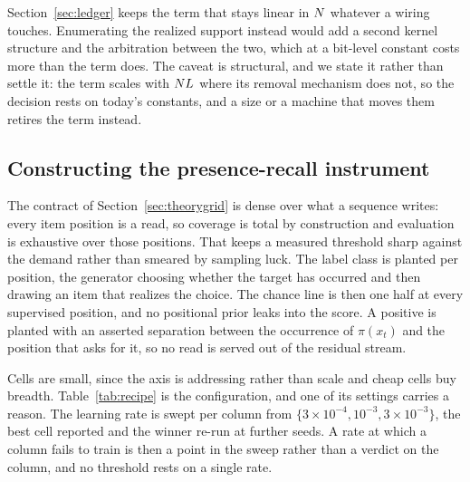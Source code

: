 Section~\ref{sec:ledger} keeps the term that stays linear in $N$ whatever a wiring touches. Enumerating the realized support instead would add a second kernel structure and the arbitration between the two, which at a bit-level constant costs more than the term does. The caveat is structural, and we state it rather than settle it: the term scales with $N L$ where its removal mechanism does not, so the decision rests on today's constants, and a size or a machine that moves them retires the term instead.

\subsection{Constructing the presence-recall instrument}
\label{apd:instrument}

The contract of Section~\ref{sec:theorygrid} is dense over what a sequence writes: every item position is a read, so coverage is total by construction and evaluation is exhaustive over those positions. That keeps a measured threshold sharp against the demand rather than smeared by sampling luck. The label class is planted per position, the generator choosing whether the target has occurred and then drawing an item that realizes the choice. The chance line is then one half at every supervised position, and no positional prior leaks into the score. A positive is planted with an asserted separation between the occurrence of $\pi(x_t)$ and the position that asks for it, so no read is served out of the residual stream.

Cells are small, since the axis is addressing rather than scale and cheap cells buy breadth. Table~\ref{tab:recipe} is the configuration, and one of its settings carries a reason. The learning rate is swept per column from $\{3 \times 10^{-4}, 10^{-3}, 3 \times 10^{-3}\}$, the best cell reported and the winner re-run at further seeds. A rate at which a column fails to train is then a point in the sweep rather than a verdict on the column, and no threshold rests on a single rate.

